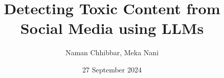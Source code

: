 \documentclass{beamer}
\title{Detecting Toxic Content from Social Media using LLMs}
\author[Naman Chhibbar \\ Meka Nani]{Naman Chhibbar, Meka Nani}
\institute{Indian Institute of Technology Hyderabad}
\date{27 September 2024}
\begin{document}
  \begin{frame}
    \titlepage
  \end{frame}
\end{document}
